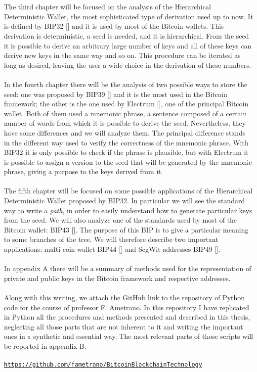 \\ \\
The third chapter will be focused on the analysis of the Hierarchical Deterministic Wallet, the most sophisticated type of derivation used up to now. It is defined by BIP32 [\cite{1}] and it is used by most of the Bitcoin wallets. This derivation is deterministic, a seed is needed, and it is hierarchical. From the seed it is possible to derive an arbitrary large number of keys and all of these keys can derive new keys in the same way and so on. This procedure can be iterated as long as desired, leaving the user a wide choice in the derivation of these numbers.
\\ \\
In the fourth chapter there will be the analysis of two possible ways to store the seed: one was proposed by BIP39 [\cite{2}] and it is the most used in the Bitcoin framework; the other is the one used by Electrum [\cite{3}], one of the principal Bitcoin wallet. Both of them used a mnemonic phrase, a sentence composed of a certain number of words from which it is possible to derive the seed. Nevertheless, they have some differences and we will analyze them. The principal difference stands in the different way used to verify the correctness of the mnemonic phrase. With BIP32 it is only possible to check if the phrase is plausible, but with Electrum it is possible to assign a version to the seed that will be generated by the mnemonic phrase, giving a purpose to the keys derived from it.
\\ \\
The fifth chapter will be focused on some possible applications of the Hierarchical Deterministic Wallet proposed by BIP32. In particular we will see the standard way to write a \textit{path}, in order to easily understand how to generate particular keys from the seed.  We will also analyze one of the standards used by most of the Bitcoin wallet: BIP43 [\cite{4}]. The purpose of this BIP is to give a particular meaning to some branches of the tree. We will therefore describe two important applications: multi-coin wallet BIP44 [\cite{5}] and SegWit addresses BIP49 [\cite{6}].
\\ \\
In appendix A there will be a summary of methods used for the representation of private and public keys in the Bitcoin framework and respective addresses.
\\ \\
Along with this writing, we attach the GitHub link to the repository of Python code for the course of professor F. Ametrano. In this repository I have replicated in Python all the procedures and methods presented and described in this thesis, neglecting all those parts that are not inherent to it and writing the important ones in a synthetic and essential way. The most relevant parts of those scripts will be reported in appendix B.
\\ \\
\hypersetup{
	colorlinks=true,
	urlcolor=black
}
\href{https://github.com/fametrano/BitcoinBlockchainTechnology}{\texttt{https://github.com/fametrano/BitcoinBlockchainTechnology}}
